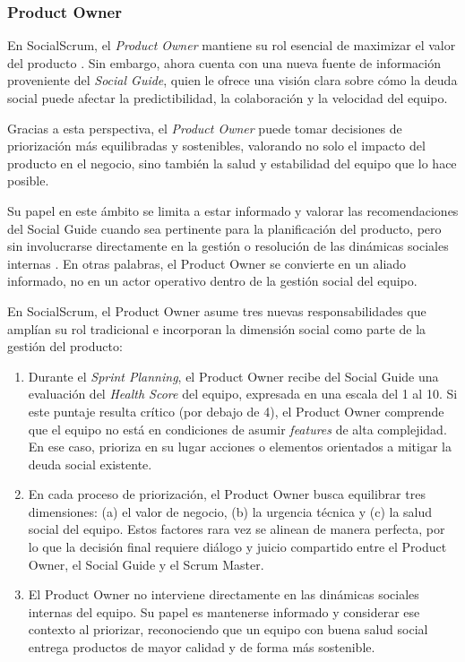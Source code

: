 \subsubsection{Product Owner}

En SocialScrum, el \textit{Product Owner} mantiene su rol esencial de maximizar el valor del producto \cite{schwaber2020scrum}. Sin embargo, ahora cuenta con una nueva fuente de información proveniente del \textit{Social Guide}, quien le ofrece una visión clara sobre cómo la deuda social puede afectar la predictibilidad, la colaboración y la velocidad del equipo.

Gracias a esta perspectiva, el \textit{Product Owner} puede tomar decisiones de priorización más equilibradas y sostenibles, valorando no solo el impacto del producto en el negocio, sino también la salud y estabilidad del equipo que lo hace posible.

Su papel en este ámbito se limita a estar informado y valorar las recomendaciones del Social Guide cuando sea pertinente para la planificación del producto, pero sin involucrarse directamente en la gestión o resolución de las dinámicas sociales internas \cite{saeeda2024nontechnicaldebt}.
En otras palabras, el Product Owner se convierte en un aliado informado, no en un actor operativo dentro de la gestión social del equipo.

En SocialScrum, el Product Owner asume tres nuevas responsabilidades que amplían su rol tradicional e incorporan la dimensión social como parte de la gestión del producto:

\begin{enumerate}
    \item Durante el \textit{Sprint Planning}, el Product Owner recibe del Social Guide una evaluación del \textit{Health Score} del equipo, expresada en una escala del 1 al 10. Si este puntaje resulta crítico (por debajo de 4), el Product Owner comprende que el equipo no está en condiciones de asumir \textit{features} de alta complejidad. En ese caso, prioriza en su lugar acciones o elementos orientados a mitigar la deuda social existente.
    \item En cada proceso de priorización, el Product Owner busca equilibrar tres dimensiones: (a) el valor de negocio, (b) la urgencia técnica y (c) la salud social del equipo. Estos factores rara vez se alinean de manera perfecta, por lo que la decisión final requiere diálogo y juicio compartido entre el Product Owner, el Social Guide y el Scrum Master.
    \item El Product Owner no interviene directamente en las dinámicas sociales internas del equipo. Su papel es mantenerse informado y considerar ese contexto al priorizar, reconociendo que un equipo con buena salud social entrega productos de mayor calidad y de forma más sostenible.
\end{enumerate}

